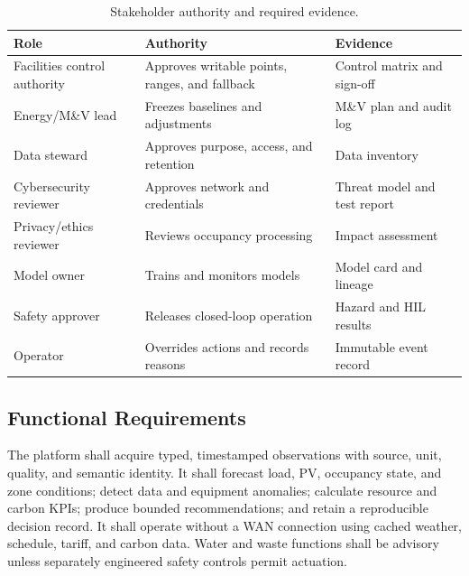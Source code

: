 \begin{table}[t]
	\centering
	\caption{Stakeholder authority and required evidence.}
	\label{tab:stakeholders}
	\begin{tabularx}{\columnwidth}{p{}XX}
		\toprule
		Role                         & Authority                                      & Evidence                     \\
		\midrule
		Facilities control authority & Approves writable points, ranges, and fallback & Control matrix and sign-off  \\
		Energy/M\&V lead             & Freezes baselines and adjustments              & M\&V plan and audit log      \\
		Data steward                 & Approves purpose, access, and retention        & Data inventory               \\
		Cybersecurity reviewer       & Approves network and credentials               & Threat model and test report \\
		Privacy/ethics reviewer      & Reviews occupancy processing                   & Impact assessment            \\
		Model owner                  & Trains and monitors models                     & Model card and lineage       \\
		Safety approver              & Releases closed-loop operation                 & Hazard and HIL results       \\
		Operator                     & Overrides actions and records reasons          & Immutable event record       \\
		\bottomrule
	\end{tabularx}
\end{table}

\subsection{Functional Requirements}

The platform shall acquire typed, timestamped observations with source, unit, quality, and semantic identity. It shall forecast load, PV, occupancy state, and zone conditions; detect data and equipment anomalies; calculate resource and carbon KPIs; produce bounded recommendations; and retain a reproducible decision record. It shall operate without a WAN connection using cached weather, schedule, tariff, and carbon data. Water and waste functions shall be advisory unless separately engineered safety controls permit actuation.

